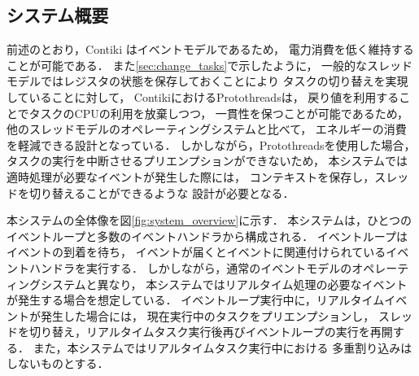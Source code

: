 \subsection{システム概要}
前述のとおり，Contiki\cite{Dunkels:2004:CLF:1032658.1034117}
はイベントモデルであるため，
電力消費を低く維持することが可能である．
また\ref{sec:change_tasks}で示したように，
一般的なスレッドモデルではレジスタの状態を保存しておくことにより
タスクの切り替えを実現していることに対して，
ContikiにおけるProtothreads\cite{Dunkels:2006:PSE:1182807.1182811}は，
戻り値を利用することでタスクのCPUの利用を放棄しつつ，
一貫性を保つことが可能であるため，
他のスレッドモデルのオペレーティングシステムと比べて，
エネルギーの消費を軽減できる設計となっている．
しかしながら，Protothreadsを使用した場合，
タスクの実行を中断させるプリエンプションができないため，
本システムでは適時処理が必要なイベントが発生した際には，
コンテキストを保存し，スレッドを切り替えることができるような
設計が必要となる．

本システムの全体像を図\ref{fig:system_overview}に示す．
本システムは，ひとつのイベントループと多数のイベントハンドラから構成される．
イベントループはイベントの到着を待ち，
イベントが届くとイベントに関連付けられているイベントハンドラを実行する．
しかしながら，通常のイベントモデルのオペレーティングシステムと異なり，
本システムではリアルタイム処理の必要なイベントが発生する場合を想定している．
イベントループ実行中に，リアルタイムイベントが発生した場合には，
現在実行中のタスクをプリエンプションし，
スレッドを切り替え，リアルタイムタスク実行後再びイベントループの実行を再開する．
また，本システムではリアルタイムタスク実行中における
多重割り込みはしないものとする．










